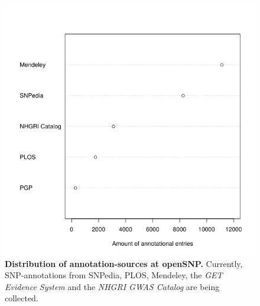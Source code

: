\documentclass[10pt]{article}
\begin{document}
\begin{figure}[!ht]
	\begin{center}
		\includegraphics[scale=0.5]{25_10_2012_Graphs/papers_dotchart.tif}
	\end{center}
	\caption{
	{\bf Distribution of annotation-sources at openSNP.} Currently, SNP-annotations from SNPedia, PLOS, Mendeley, the \emph{GET Evidence System} and the \emph{NHGRI GWAS Catalog} are being collected.}
	\label{Figure3_label}
\end{figure}
\end{document}

